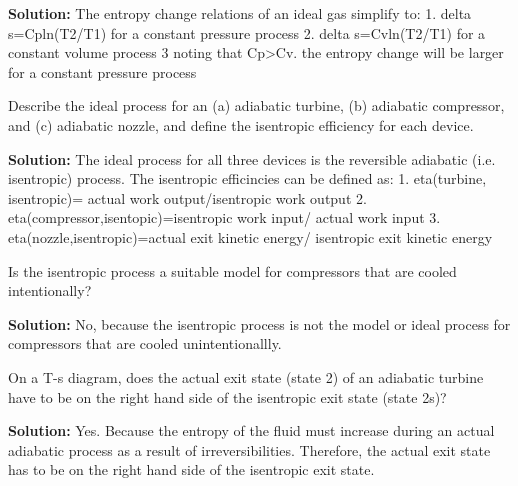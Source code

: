 \begin{list}{\bf Question :~}{}
       {\bf Solution:} The entropy change relations of an ideal gas simplify to: 1. delta s=Cpln(T2/T1) for a constant pressure process 2. delta s=Cvln(T2/T1) for a constant volume process 3 noting that Cp>Cv. the entropy change will be larger for a constant pressure process

%
     \item\label{Q49} Describe the ideal process for an (a) adiabatic turbine, (b) adiabatic compressor, and (c) adiabatic nozzle, and define the isentropic efficiency for each device.
%

       {\bf Solution:} The ideal process for all three devices is the reversible adiabatic (i.e. isentropic) process. The isentropic efficincies can be defined as: 1. eta(turbine, isentropic)= actual work output/isentropic work output 2. eta(compressor,isentopic)=isentropic work input/ actual work input 3. eta(nozzle,isentropic)=actual exit kinetic energy/ isentropic exit kinetic energy


%
     \item\label{Q50} Is the isentropic process a suitable model for compressors that are cooled intentionally? 
%

       {\bf Solution:} No, because the isentropic process is not the model or ideal process for compressors that are cooled unintentionallly.

%
     \item\label{Q51} On a T-s diagram, does the actual exit state (state 2) of an adiabatic turbine have to be on the right hand side of the isentropic exit state (state 2s)?
%

       {\bf Solution:} Yes. Because the entropy of the fluid must increase during an actual adiabatic process as a result of irreversibilities. Therefore, the actual exit state has to be on the right hand side of the isentropic exit state.

%
\end{list}
